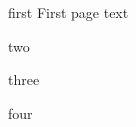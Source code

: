 \documentclass[greennotebook]{Silversiders} %
\begin{document}
\startnotebook{\nFamineGreenTwo{}}

\begin{page}{first}
First page text
\end{page}

\begin{page}{two}

\end{page}

\begin{page}{three}

\end{page}

\begin{page}{four}

\end{page}

\endnotebook
\end{document}

